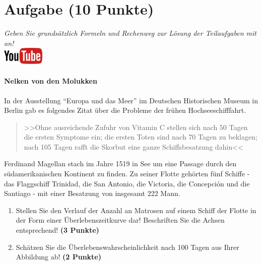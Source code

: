 \documentclass[a4paper, 9pt]{scrartcl}\usepackage[]{graphicx}\usepackage[]{xcolor}
\begin{document}
 
\clearpage

\section{Aufgabe \hfill (10 Punkte)}

\textit{Geben Sie grunds{\"a}tzlich Formeln und Rechenweg zur L{\"o}sung der
  Teilaufgaben mit an!} \\[1Ex]

\hfill\href{https://youtu.be/1B53cVFIU7Q}{\includegraphics[width =
  2cm]{img/youtube}} %
\hspace{2Ex}

\paragraph{Nelken von den Molukken}



In der Ausstellung "`Europa und das Meer"' im Deutschen Historischen Museum in
Berlin gab es folgendes Zitat {\"u}ber die Probleme der fr{\"u}hen Hochseeschifffahrt.

\begin{quote}
  >>Ohne ausreichende Zufuhr von Vitamin C stellen sich nach 50 Tagen die
  ersten Symptome ein; die ersten Toten sind nach 70 Tagen zu beklagen;
  nach 105 Tagen rafft die Skorbut eine ganze Schiffsbesatzung dahin<<
\end{quote}

Ferdinand Magellan stach im Jahre 1519 in See um eine Passage durch den
s{\"u}damerikanischen Kontinent zu finden. Zu seiner Flotte geh{\"o}rten
f{\"u}nf Schiffe - das Flaggschiff Trinidad, die San Antonio, die Victoria, die
Concepci{\'o}n und die Santiago - mit einer Besatzung von insgesamt
222 Mann. 

\begin{enumerate}
\item Stellen Sie den Verlauf der Anzahl an Matrosen auf einem Schiff der
  Flotte in der Form einer {\"U}berlebenszeitkurve dar! Beschriften Sie die
  Achsen entsprechend! \textbf{(3 Punkte)} 
\item Sch{\"a}tzen Sie die {\"U}berlebenswahrscheinlichkeit nach 100 Tagen
  aus Ihrer Abbildung ab! \textbf{(2 Punkte)} 
\end{enumerate}
\end{document}
